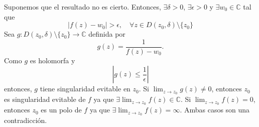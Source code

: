 \begin{dem}
  Suponemos que el resultado no es cierto. Entonces, $\exists \delta > 0$, $\exists \epsilon > 0$ y $\exists w_{0} \in \mathbb{C}$ tal que
  \[ 
    | f(z) - w_{0} |>\epsilon, \quad \forall z \in D(z_{0}, \delta) \setminus \{ z_{0} \} 
  \] 
  Sea $g : D(z_{0}, \delta) \setminus \{ z_{0} \} \to \mathbb{C}$ definida por 
  \[ 
    g(z) = \frac{1}{f(z) - w_{0}}.
  \] 
  Como $g$ es holomorfa y 
  \[
    | g(z) \leq \frac{1}{\epsilon} |
  \]
  entonces, $g$ tiene singularidad evitable en $z_{0}$. Si $\lim_{z \to z_{0}} g(z) \neq 0$, entonces $z_{0}$ es singularidad evitable de $f$ ya que $\exists \lim_{z \to z_{0}} f(z) \in \mathbb{C}$. Si $\lim_{z \to z_{0}} f(z) = 0$, entonces $z_{0}$ es un polo de $f$ ya que $\exists \lim_{z \to z_{0}} f(z) = \infty$. Ambas casos son una contradicción.
\end{dem}
